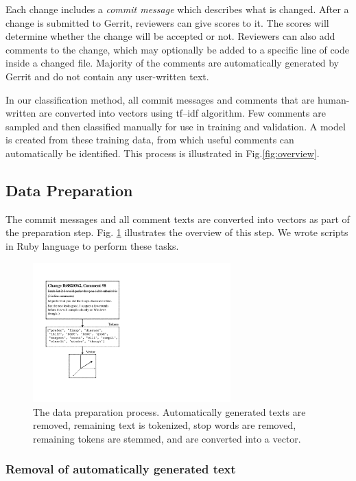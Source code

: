 \documentclass[conference]{IEEEtran}
\begin{document}
Each change includes a \emph{commit message} which describes what is changed.
After a change is submitted to Gerrit, reviewers can give scores to it.
The scores will determine whether the change will be accepted or not.
Reviewers can also add comments to the change, which may optionally be added to a specific line of code inside a changed file.
Majority of the comments are automatically generated by Gerrit and do not contain any user-written text.

In our classification method,
all commit messages and comments that are human-written are converted into vectors using tf--idf algorithm.
Few comments are sampled and then classified manually for use in training and validation.
A model is created from these training data, from which useful comments can automatically be identified.
This process is illustrated in Fig.\ref{fig:overview}.




\subsection{Data Preparation}

The commit messages and all comment texts are converted into vectors as part of the preparation step.
Fig. \ref{fig:preprocess} illustrates the overview of this step.
We wrote scripts in Ruby language to perform these tasks.

\begin{figure}[h]
\centering
\includegraphics[width=3in]{preprocess}
\caption{The data preparation process.
Automatically generated texts are removed, remaining text is tokenized, stop words are removed, remaining tokens are stemmed,
and are converted into a vector.}
\label{fig:preprocess}
\end{figure}



\subsubsection{Removal of automatically generated text}
\end{document}
